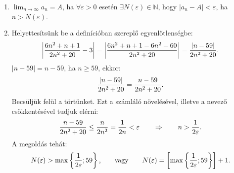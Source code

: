 \documentclass[11pt]{scrartcl}
\begin{document}
\begin{enumerate}
	\item $\displaystyle\lim_{n \to \infty} a_n = A$, ha $\forall\varepsilon > 0$
	      esetén $\exists N(\varepsilon) \in \mathbb{N}$, hogy
	      $|a_n - A| < \varepsilon$, ha $n > N(\varepsilon)$.


	\item Helyettesítsünk be a definícióban szereplő egyenlőtlenségbe:
	      \[
		      \left| \frac{6n^2 + n + 1}{2n^2 + 20} - 3 \right|
		      = \left| \frac{6n^2 + n + 1 - 6n^2 - 60}{2n^2 + 20} \right|
		      = \frac{|n - 59|}{2n^2 + 20}
		      \text.
	      \]
	      $|n - 59| = n - 59$, ha $n \ge 59$, ekkor:
	      \[
		      \frac{|n - 59|}{2n^2 + 20}
		      = \frac{n - 59}{2n^2 + 20}
		      \text.
	      \]
	      Becsüljük felül a törtünket. Ezt a számláló növelésével, illetve a
	      nevező csökkentésével tudjuk elérni:
	      \[
		      \frac{n - 59}{2n^2 + 20}
		      \le \frac{n}{2n^2}
		      = \frac{1}{2n}
		      < \varepsilon
		      \qquad \Rightarrow \qquad
		      n > \frac{1}{2 \varepsilon}
		      \text.
	      \]
	      A megoldás tehát:
	      \[
		      N(\varepsilon) > \max \left\{ \frac{1}{2\varepsilon}; 59 \right\}
		      \text, \qquad \text{vagy} \qquad
		      N(\varepsilon) = \left[
			      \max \left\{ \frac{1}{2\varepsilon}; 59 \right\}
			      \right] + 1
		      \text.
	      \]
\end{enumerate}
\end{document}
